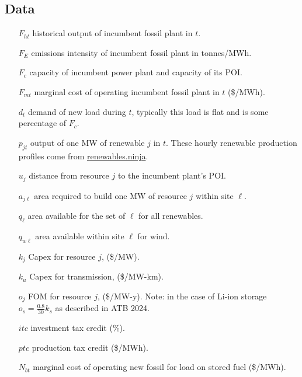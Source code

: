 \documentclass[9pt, oneside]{article}
\numberwithin{equation}{subsubsection}
\begin{document}
\subsection{Data}\label{subsec:data}
\begin{multicols}{2}
	{\small
		\begin{itemize}
			\item[$F_{ht}$] historical output of incumbent fossil plant in $t$.
			\item[$F_{E}$] emissions intensity of incumbent fossil plant in tonnes/MWh.
			\item[$F_c$] capacity of incumbent power plant and capacity of its POI.
			\item[$F_{mt}$] marginal cost of operating incumbent fossil plant in $t$ (\$/MWh).
			\item[$d_{t}$] demand of new load during $t$, typically this load is flat and is some percentage of $F_c$.
			\item[$p_{jt}$] output of one MW of renewable $j$ in $t$.
			      These hourly renewable production profiles come from \href{https://www.renewables.ninja}{renewables.ninja}.
			\item[$u_{j}$] distance from resource $j$ to the incumbent plant's POI.
			\item[$a_{j\ell}$] area required to build one MW of resource $j$ within site $\ell$.
			\item[$q_{\ell}$] area available for the set of $\ell$ for all renewables.
			\item[$q_{w\ell}$] area available within site $\ell$ for wind.
			\item[$k_{j}$] Capex for resource $j$, (\$/MW).
			\item[$k_u$] Capex for transmission, (\$/MW-km).
			\item[$o_{j}$] FOM for resource $j$, (\$/MW-y). Note: in the case of Li-ion storage $o_s = \frac{0.8}{30} k_s$ as described in ATB 2024.
			\item[$itc$] investment tax credit (\%).
			\item[$ptc$] production tax credit (\$/MWh).
			\item[$N_{bt}$] marginal cost of operating new fossil for load on stored fuel (\$/MWh).
		\end{itemize}
	}

\end{multicols}
\end{document}
